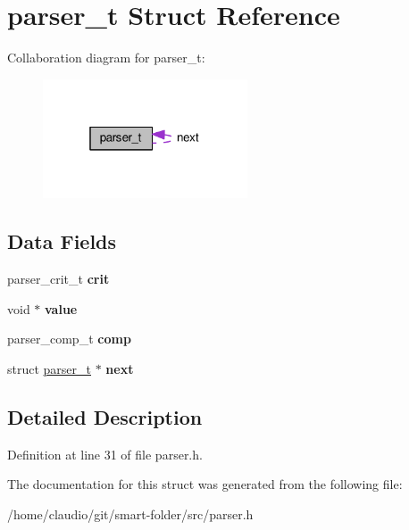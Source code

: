 \hypertarget{structparser__t}{}\section{parser\+\_\+t Struct Reference}
\label{structparser__t}


Collaboration diagram for parser\+\_\+t\+:\nopagebreak
\begin{figure}[H]
\begin{center}
\leavevmode
\includegraphics[width=172pt]{structparser__t__coll__graph}
\end{center}
\end{figure}
\subsection*{Data Fields}
\begin{DoxyCompactItemize}
\item 
parser\+\_\+crit\+\_\+t {\bfseries crit}\hypertarget{structparser__t_af8e04406eee9097a92118be27b07eff7}{}\label{structparser__t_af8e04406eee9097a92118be27b07eff7}

\item 
void $\ast$ {\bfseries value}\hypertarget{structparser__t_a0f61d63b009d0880a89c843bd50d8d76}{}\label{structparser__t_a0f61d63b009d0880a89c843bd50d8d76}

\item 
parser\+\_\+comp\+\_\+t {\bfseries comp}\hypertarget{structparser__t_a7bc05cec4ebb98215d11f1f354450f3d}{}\label{structparser__t_a7bc05cec4ebb98215d11f1f354450f3d}

\item 
struct \hyperlink{structparser__t}{parser\+\_\+t} $\ast$ {\bfseries next}\hypertarget{structparser__t_a044a5d882012dfdd9ea5e4f3a98fd8a2}{}\label{structparser__t_a044a5d882012dfdd9ea5e4f3a98fd8a2}

\end{DoxyCompactItemize}


\subsection{Detailed Description}


Definition at line 31 of file parser.\+h.



The documentation for this struct was generated from the following file\+:\begin{DoxyCompactItemize}
\item 
/home/claudio/git/smart-\/folder/src/parser.\+h\end{DoxyCompactItemize}
